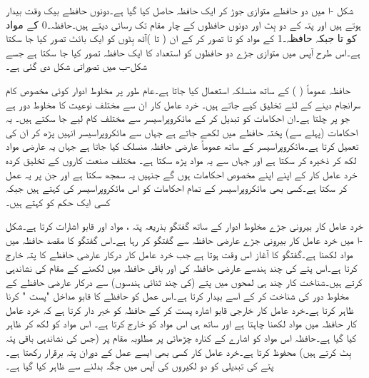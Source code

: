 شکل -ا میں دو  حافظے متوازی جوڑ کر ایک  حافظہ حاصل کیا گیا ہے۔دونوں حافظے بیک وقت بیدار ہوتے ہیں اور پتہ کے دو بِٹ  اور  دونوں حافظوں کے چار مقام تک رسائی دیتے ہیں۔حافظہ۔0 کے مواد کو  تا  جبکہ حافظہ۔1 کے مواد کو  تا  تصور کر کے 
ان ( تا )آٹھ بِٹوں کو ایک بائٹ تصور کیا جا سکتا ہے۔اس طرح آپس میں متوازی جڑے دو حافظوں کو  استعداد کا ایک حافظہ تصور کیا جا سکتا ہے جسے شکل-ب میں تصوراتی شکل دی گئی ہے۔ 

حافظہ عموماً  ( ) کے ساتھ منسلکہ استعمال کیا جاتا ہے۔عام طور پر مخلوط ادوار کوئی مخصوص کام سرانجام دینے کے لئے تخلیق کیے جاتے ہیں۔ خرد عامل کار ان سے مختلف نوعیت کا مخلوط دور ہے جو  پر چلتا ہے۔ان احکامات کو تبدیل کر کے مائکروپراسیسر سے مختلف کام لیے جا سکتے ہیں۔ یہ احکامات (پہلے سے) پختہ حافظے میں لکھے جاتے ہے جہاں سے مائکروپراسیسر انہیں پڑھ کر ان کی تعمیل کرتا ہے۔مائکروپراسیسر کے ساتھ عموماً عارضی حافظہ منسلک کیا جاتا ہے جہاں یہ عارضی مواد لکھ کر ذخیرہ کر سکتا ہے اور جہاں سے یہ مواد پڑھ سکتا ہے۔ مختلف صنعت کاروں کے تخلیق کردہ خرد عامل کار کے اپنے اپنے مخصوص احکامات ہوں گے جنہیں یہ سمجھ سکتا ہے اور جن پر یہ عمل کر سکتا ہے۔کسی بھی مائکروپراسیسر کے تمام احکامات کو اس مائکروپراسیسر کی  کہتے ہیں جبکہ کسی ایک حکم کو کہتے ہیں۔


خرد عامل کار بیرونی جڑے مخلوط ادوار کے ساتھ گفتگو بذریعہ پتہ ، مواد اور قابو اشارات کرتا ہے۔شکل -ا میں خرد عامل کار بیرونی جڑے عارضی حافظہ سے گفتگو کر رہا ہے۔اس گفتگو کا مقصد حافظہ میں مواد لکھنا ہے۔گفتگو کا آغاز اس وقت ہوتا ہے جب خرد عامل کار درکار عارضی حافظے کا پتہ خارج کرتا ہے۔اس پتے کی چند ہندسے عارضی حافظہ کی اور باقی حافظہ میں لکھنے کے مقام کی نشاندہی کرتے ہیں۔شناخت کار چند ہی لمحوں میں پتے (کی چند ثنائی ہندسوں) سے درکار عارضی حافظے کے مخلوط دور کی شناخت کر کے اسے بیدار کرتا ہے۔اس عمل کو حافظے کا قابو مداخل "پست " کرنا ظاہر کرتا ہے۔خرد عامل کار خارجی قابو اشارہ  پست کر کے حافظہ کو خبر دار کرتا ہے کہ خرد عامل کار حافظہ میں مواد لکھنا چاہتا ہے اور ساتھ ہی اس مواد کو خارج کرتا ہے۔ اس مواد کو  لکھ کر ظاہر کیا گیا ہے۔حافظہ اس مواد کو  اشارے کے کنارہ چڑھائی پر مطلوبہ مقام پر (جس کی نشاندہی باقی پتہ بِٹ کرتے ہیں) محفوظ کرتا ہے۔خرد عامل کار کسی بھی ایسے عمل کے دوران پتہ برقرار رکھتا ہے۔ پتے کی تبدیلی کو دو لکیروں کی آپس میں جگہ بدلنے سے ظاہر کیا گیا ہے۔

